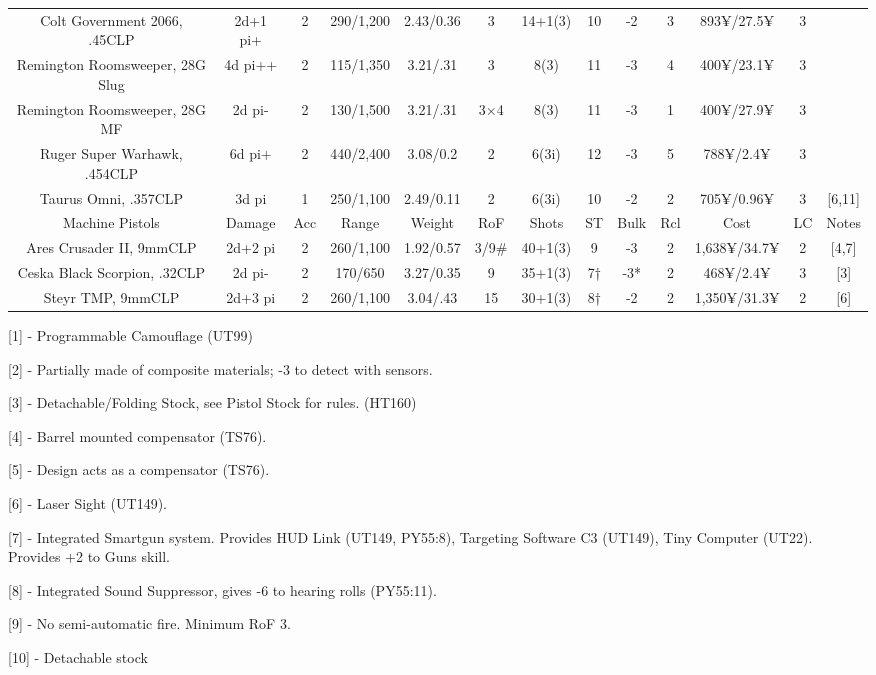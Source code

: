 \begin{center}
\begin{adjustwidth}{-8mm}{}
{\begin{tabular}{|c|c|c|c|c|c|c|c|c|c|c|c|c|}
				Colt Government 2066, .45CLP & 2d+1 pi+ & 2 & 290/1,200 & 2.43/0.36 & 3 & 14+1(3) & 10 & -2 & 3 & 893¥/27.5¥ & 3  &\\
				Remington Roomsweeper, 28G Slug & 4d pi++ & 2 & 115/1,350 & 3.21/.31 & 3 & 8(3) & 11 & -3 & 4 & 400¥/23.1¥ & 3  & \\
				Remington Roomsweeper, 28G MF & 2d pi- & 2 & 130/1,500 & 3.21/.31 & 3×4 & 8(3) & 11 & -3 & 1 & 400¥/27.9¥ & 3 &	\\
				Ruger Super Warhawk, .454CLP & 6d pi+ & 2 & 440/2,400 & 3.08/0.2 & 2 & 6(3i) & 12 & -3 & 5 & 788¥/2.4¥ & 3 	&\\
				Taurus Omni, .357CLP  & 3d pi & 1 & 250/1,100 & 2.49/0.11 & 2 & 6(3i) & 10 & -2 & 2 & 705¥/0.96¥ & 3 & [6,11]\\
				\hline
				Machine Pistols & Damage & Acc & Range & Weight & RoF & Shots & ST & Bulk & Rcl & Cost & LC & Notes\\
				\hline
				Ares Crusader II, 9mmCLP & 2d+2 pi & 2 & 260/1,100 & 1.92/0.57 & 3/9\# & 40+1(3) & 9 & -3 & 2 & 1,638¥/34.7¥ & 2 & [4,7] \\
				Ceska Black Scorpion, .32CLP & 2d pi- & 2 & 170/650 & 3.27/0.35 & 9 & 35+1(3) & 7† & -3* & 2 & 468¥/2.4¥ & 3 & [3] \\
				Steyr TMP, 9mmCLP & 2d+3 pi & 2 & 260/1,100 & 3.04/.43 & 15 & 30+1(3) & 8† & -2 & 2 & 1,350¥/31.3¥ & 2 & [6] \\
				\hline
			\end{tabular}
		}
	\end{adjustwidth}
\end{center}

[1] - Programmable Camouflage (UT99)

[2] - Partially made of composite materials; -3 to detect with sensors.

[3] - Detachable/Folding Stock, see Pistol Stock for rules. (HT160)

[4] - Barrel mounted compensator (TS76).

[5] - Design acts as a compensator (TS76).

[6] - Laser Sight (UT149).

[7] - Integrated Smartgun system. Provides HUD Link (UT149, PY55:8), Targeting Software C3 (UT149), Tiny Computer (UT22). Provides +2 to Guns skill.

[8] - Integrated Sound Suppressor, gives -6 to hearing rolls (PY55:11).

[9] - No semi-automatic fire. Minimum RoF 3.

[10] - Detachable stock

